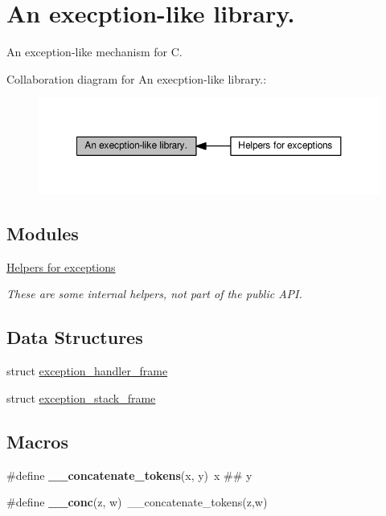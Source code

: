 \hypertarget{group__exceptions}{}\section{An execption-\/like library.}
\label{group__exceptions}


An exception-\/like mechanism for C.  


Collaboration diagram for An execption-\/like library.\+:\nopagebreak
\begin{figure}[H]
\begin{center}
\leavevmode
\includegraphics[width=350pt]{group__exceptions}
\end{center}
\end{figure}
\subsection*{Modules}
\begin{DoxyCompactItemize}
\item 
\hyperlink{group__helpers}{Helpers for exceptions}
\begin{DoxyCompactList}\small\item\em These are some internal helpers, not part of the public A\+PI. \end{DoxyCompactList}\end{DoxyCompactItemize}
\subsection*{Data Structures}
\begin{DoxyCompactItemize}
\item 
struct \hyperlink{structexception__handler__frame}{exception\+\_\+handler\+\_\+frame}
\item 
struct \hyperlink{structexception__stack__frame}{exception\+\_\+stack\+\_\+frame}
\end{DoxyCompactItemize}
\subsection*{Macros}
\begin{DoxyCompactItemize}
\item 
\#define {\bfseries \+\_\+\+\_\+concatenate\+\_\+tokens}(x,  y)~x \#\# y\hypertarget{group__exceptions_gadf8cc03bd0ede7f3e5aafa57de5016dd}{}\label{group__exceptions_gadf8cc03bd0ede7f3e5aafa57de5016dd}

\item 
\#define {\bfseries \+\_\+\+\_\+conc}(z,  w)~\+\_\+\+\_\+concatenate\+\_\+tokens(z,w)\hypertarget{group__exceptions_ga0d2e02c74b05d3ff3bfa9eb3dcd891e3}{}\label{group__exceptions_ga0d2e02c74b05d3ff3bfa9eb3dcd891e3}

\end{DoxyCompactItemize}
